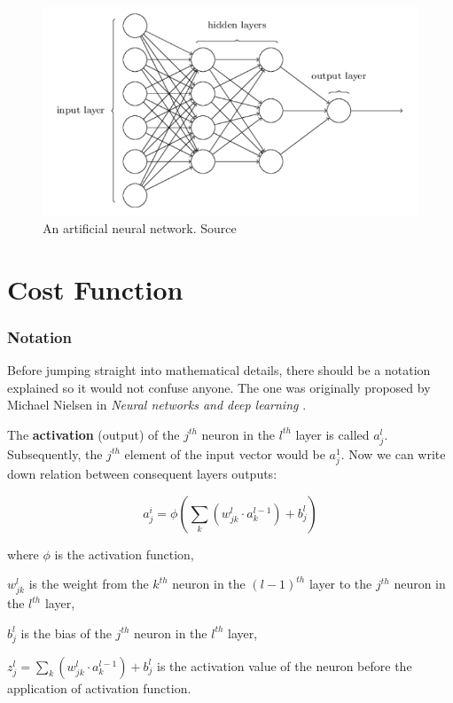 \begin{figure}[h]
    \centering
    \includegraphics[width=12cm]{img/ANN-diagram.png}
    \caption{An artificial neural network. Source \cite{NNandDL}}
    \label{fig:ann}
\end{figure}

\section{Cost Function}
\label{sec:cost-function}

\subsubsection*{Notation}
\label{sub2:notation}

Before jumping straight into mathematical details, there should be a notation explained so it would not confuse anyone. The one was originally proposed by Michael Nielsen in \emph{Neural networks and deep learning} \cite{NNandDL}.

The \textbf{activation} (output) of the $j^{th}$ neuron in the $l^{th}$ layer is called $a^l_j$. Subsequently, the $j^{th}$ element of the input vector would be $a^1_j$. Now we can write down relation between consequent layers outputs:

\begin{equation}
\label{eq:2.1}
a^i_j = \phi\left(\sum_k (w^l_{jk} \cdot a^{l-1}_k) + b^l_j\right)
\end{equation}

where $\phi$ is the activation function,

$w^l_{jk}$ is the weight from the $k^{th}$ neuron in the $(l-1)^{th}$ layer to the $j^{th}$ neuron in the $l^{th}$ layer,

$b^l_j$ is the bias of the $j^{th}$ neuron in the $l^{th}$ layer,

$z^l_j = \sum_k (w^l_{jk} \cdot a^{l-1}_k) + b^l_j$ is the activation value of the neuron before the application of activation function.


